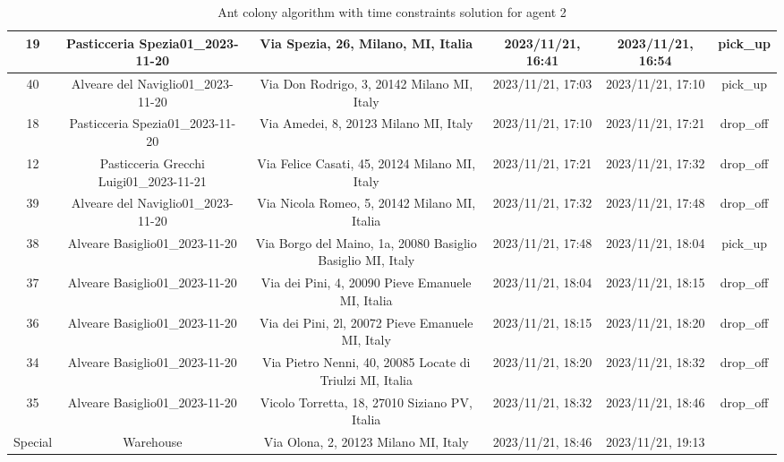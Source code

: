 \documentclass[titlepage]{article}
\begin{document}
\begin{table}[H]
\begin{adjustbox}{max width=\textwidth}
\begin{tabular}{|c|c|c|c|c|c|}
19 & Pasticceria Spezia01\_2023-11-20 & Via Spezia, 26, Milano, MI, Italia & 2023/11/21, 16:41 & 2023/11/21, 16:54 & pick\_up \\
\hline
40 & Alveare del Naviglio01\_2023-11-20 & Via Don Rodrigo, 3, 20142 Milano MI, Italy & 2023/11/21, 17:03 & 2023/11/21, 17:10 & pick\_up \\
\hline
18 & Pasticceria Spezia01\_2023-11-20 & Via Amedei, 8, 20123 Milano MI, Italy & 2023/11/21, 17:10 & 2023/11/21, 17:21 & drop\_off \\
\hline
12 & Pasticceria Grecchi Luigi01\_2023-11-21 & Via Felice Casati, 45, 20124 Milano MI, Italy & 2023/11/21, 17:21 & 2023/11/21, 17:32 & drop\_off \\
\hline
39 & Alveare del Naviglio01\_2023-11-20 & Via Nicola Romeo, 5, 20142 Milano MI, Italia & 2023/11/21, 17:32 & 2023/11/21, 17:48 & drop\_off \\
\hline
38 & Alveare Basiglio01\_2023-11-20 & Via Borgo del Maino, 1a, 20080 Basiglio Basiglio MI, Italy & 2023/11/21, 17:48 & 2023/11/21, 18:04 & pick\_up \\
\hline
37 & Alveare Basiglio01\_2023-11-20 & Via dei Pini, 4, 20090 Pieve Emanuele MI, Italia & 2023/11/21, 18:04 & 2023/11/21, 18:15 & drop\_off \\
\hline
36 & Alveare Basiglio01\_2023-11-20 & Via dei Pini, 2l, 20072 Pieve Emanuele MI, Italy & 2023/11/21, 18:15 & 2023/11/21, 18:20 & drop\_off \\
\hline
34 & Alveare Basiglio01\_2023-11-20 & Via Pietro Nenni, 40, 20085 Locate di Triulzi MI, Italia & 2023/11/21, 18:20 & 2023/11/21, 18:32 & drop\_off \\
\hline
35 & Alveare Basiglio01\_2023-11-20 & Vicolo Torretta, 18, 27010 Siziano PV, Italia & 2023/11/21, 18:32 & 2023/11/21, 18:46 & drop\_off \\
\hline
Special & Warehouse & Via Olona, 2, 20123 Milano MI, Italy & 2023/11/21, 18:46 & 2023/11/21, 19:13 & \\
\hline
\end{tabular}
\end{adjustbox}
\caption{Ant colony algorithm with time constraints solution for agent 2}
\label{tab:mysolution2}
\end{table}
\end{document}
